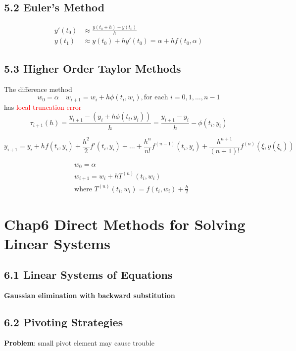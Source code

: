 \documentclass[11pt]{article}
\begin{document}
\subsection{5.2 Euler's Method}
\label{sec:org6d9f2bd}
\begin{align*}
y'(t_0)&\approx\frac{y(t_0+h)-y(t_0)}{h}\\
y(t_1)&\approx y(t_0)+hy'(t_0)=\alpha+hf(t_0,\alpha)
\end{align*}
\subsection{5.3 Higher Order Taylor Methods}
\label{sec:orgfef7335}
\begin{definition}
The difference method
\begin{equation*}
w_0=\alpha\quad w_{i+1}=w_i+h\phi(t_i,w_i), \text{for each } i = 0,1,\dots, n-1
\end{equation*}
has \textcolor{red}{local truncation error}
\begin{equation*}
\tau_{i+1}(h)=\frac{y_{i+1}-(y_i+h\phi(t_i,y_i))}{h}=\frac{y_{i+1}-y_i}{h}-\phi(t_i,y_i)
\end{equation*}
\end{definition}

\begin{equation*}
y_{i+1}=y_i+hf(t_i,y_i)+\frac{h^2}{2}f'(t_i,y_i)+\dots+\frac{h^n}{n!}f^{(n-1)}(t_i,y_i)
+ \frac{h^{n+1}}{(n+1)!}f^{(n)}(\xi, y(\xi_i))
\end{equation*}

\begin{align*}
&w_0=\alpha\\
&w_{i+1}=w_i+hT^{(n)}(t_i,w_i)\\
&\text{where } T^{(n)}(t_i,w_i)=f(t_i,w_i)+\frac{h}{2}
\end{align*}
\section{Chap6 Direct Methods for Solving Linear Systems}
\label{sec:org9c9ea18}
\subsection{6.1 Linear Systems of Equations}
\label{sec:org98f2af5}
\textbf{Gaussian elimination with backward substitution}
\subsection{6.2 Pivoting Strategies}
\label{sec:org6d1825d}
\textbf{Problem}: small pivot element may cause trouble
\end{document}

